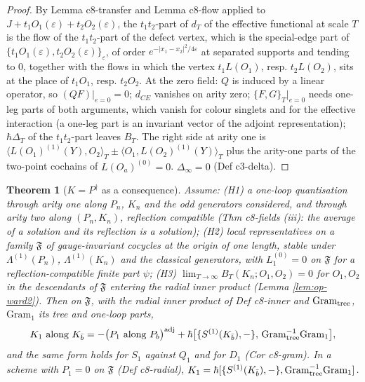 \documentclass[11pt]{article}
\numberwithin{equation}{section}
\theoremstyle{plain}
\newtheorem{theorem}{Theorem}[section]
\theoremstyle{definition}
\begin{document}
\begin{proof}
By Lemma c8-transfer and Lemma c8-flow applied to $J+t_1O_1(\varepsilon)+t_2O_2(\varepsilon)$, the $t_1t_2$-part of $d_T$ of the effective functional at scale $T$ is the flow of the $t_1t_2$-part of the defect vertex, which is the special-edge part of $\{t_1O_1(\varepsilon),t_2O_2(\varepsilon)\}_\varepsilon$, of order $e^{-|x_1-x_2|^2/4\varepsilon}$ at separated supports and tending to $0$, together with the flows in which the vertex $t_1L(O_1)$, resp. $t_2L(O_2)$, sits at the place of $t_1O_1$, resp. $t_2O_2$. At the zero field: $Q$ is induced by a linear operator, so $(QF)|_{e=0}=0$; $d_{CE}$ vanishes on arity zero; $\{F,G\}_T|_{e=0}$ needs one-leg parts of both arguments, which vanish for colour singlets and for the effective interaction (a one-leg part is an invariant vector of the adjoint representation); $\hbar\Delta_T$ of the $t_1t_2$-part leaves $B_T$. The right side at arity one is $\langle L(O_1)^{(1)}(Y),O_2\rangle_T\pm\langle O_1,L(O_2)^{(1)}(Y)\rangle_T$ plus the arity-one parts of the two-point cochains of $L(O_a)^{(0)}=0$. $\Delta_\infty=0$ (Def c3-delta).
\end{proof}

\begin{theorem}[$K=P^\dagger$ as a consequence]
\label{thm:op-c}
Assume: (H1) a one-loop quantisation through arity one along $P_n$, $K_n$ and the odd generators considered, and through arity two along $(P_n,K_n)$, reflection compatible (Thm c8-fields (iii): the average of a solution and its reflection is a solution); (H2) local representatives on a family $\mathfrak F$ of gauge-invariant cocycles at the origin of one length, stable under $\Lambda^{(1)}(P_n)$, $\Lambda^{(1)}(K_n)$ and the classical generators, with $L_1^{(0)}=0$ on $\mathfrak F$ for a reflection-compatible finite part $\psi$; (H3) $\lim_{T\to\infty}B_T(K_n;O_1,O_2)=0$ for $O_1,O_2$ in the descendants of $\mathfrak F$ entering the radial inner product (Lemma \ref{lem:op-ward2}). Then on $\mathfrak F$, with the radial inner product of Def c8-inner and $\mathrm{Gram}_{\rm tree}$, $\mathrm{Gram}_1$ its tree and one-loop parts,
\begin{equation}
K_1\text{ along }K_{\bar b}=-\big(P_1\text{ along }P_b\big)^{\rm adj}+\hbar\big[\{S^{(1)}(K_{\bar b}),-\},\,\mathrm{Gram}_{\rm tree}^{-1}\mathrm{Gram}_1\big],
\label{eq:op-KP}
\end{equation}
and the same form holds for $S_1$ against $Q_1$ and for $D_1$ (Cor c8-gram). In a scheme with $P_1=0$ on $\mathfrak F$ (Def c8-radial), $K_1=\hbar[\{S^{(1)}(K_{\bar b}),-\},\mathrm{Gram}_{\rm tree}^{-1}\mathrm{Gram}_1]$.
\end{theorem}
\end{document}
